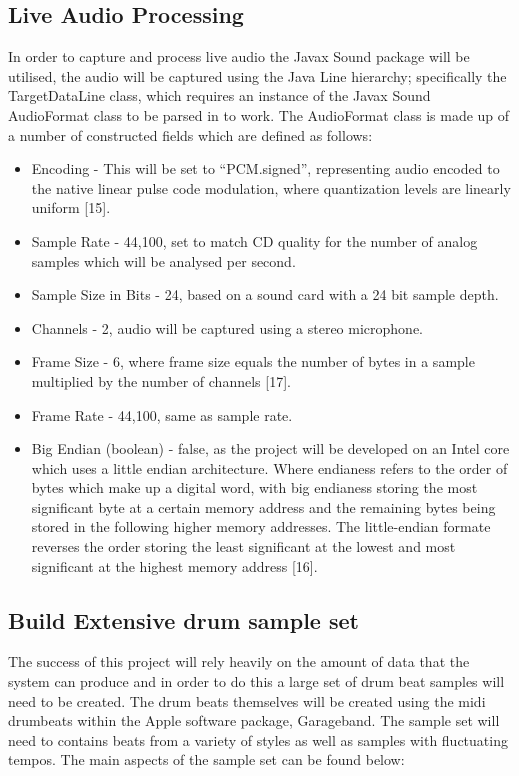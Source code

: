 \documentclass[a4paper, 11pt]{article}
\begin{document}
\subsection{Live Audio Processing}
In order to capture and process live audio the Javax Sound package will be utilised, the audio will be captured using the Java Line hierarchy; specifically the TargetDataLine class, which requires an instance of the Javax Sound AudioFormat class to be parsed in to work. The AudioFormat class is made up of a number of constructed fields which are defined as follows:

\begin{itemize}
\item Encoding - This will be set to ``PCM.signed'', representing audio encoded to the native linear pulse code modulation, where quantization levels are linearly uniform [15].
\item Sample Rate - 44,100, set to match CD quality for the number of analog samples which will be analysed per second. 
\item Sample Size in Bits - 24, based on a sound card with a 24 bit sample depth.
\item Channels - 2, audio will be captured using a stereo microphone.
\item Frame Size - 6, where frame size equals the number of bytes in a sample multiplied by the number of channels [17].
\item Frame Rate - 44,100, same as sample rate.
\item Big Endian (boolean) - false, as the project will be developed on an Intel core which uses a little endian architecture. Where endianess refers to the order of bytes which make up a digital word, with big endianess storing the most significant byte at a certain memory address and the remaining bytes being stored in the following higher memory addresses. The little-endian formate reverses the order storing the least significant at the lowest and most significant at the highest memory address [16].
\end{itemize}


\subsection{Build Extensive drum sample set}
The success of this project will rely heavily on the amount of data that the system can produce and in order to do this a large set of drum beat samples will need to be created. The drum beats themselves will be created using the midi drumbeats within the Apple software package, Garageband. The sample set will need to contains beats from a variety of styles as well as samples with fluctuating tempos. The main aspects of the sample set can be found below:
\end{document}
